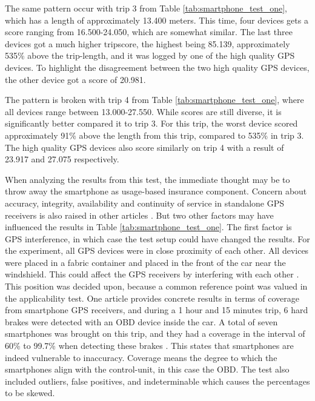 The same pattern occur with trip 3 from Table \ref{tab:smartphone_test_one}, which has a length of approximately 13.400 meters. This time, four devices gets a score ranging from 16.500-24.050, which are somewhat similar. The last three devices got a much higher tripscore, the highest being 85.139, approximately 535\% above the trip-length, and it was logged by one of the high quality GPS devices. To highlight the disagreement between the two high quality GPS devices, the other device got a score of 20.981. 

The pattern is broken with trip 4 from Table \ref{tab:smartphone_test_one}, where all devices range between 13.000-27.550. While scores are still diverse, it is significantly better compared it to trip 3. For this trip, the worst device scored approximately 91\% above the length from this trip, compared to 535\% in trip 3. The high quality GPS devices also score similarly on trip 4 with a result of 23.917 and 27.075 respectively. 

When analyzing the results from this test, the immediate thought may be to throw away the smartphone as usage-based insurance component. Concern about accuracy, integrity, availability and continuity of service in standalone GPS receivers is also raised in other articles  \citep{art:smartphones_for_monitoring_and_ubi} \citep{art:survey_mobile_phone_sensing} \citep{art:insurtelematics} \citep{art:in-car_positioning_technologies} \citep{art:challenges_smartphone_ubi}. But two other factors may have influenced the results in Table \ref{tab:smartphone_test_one}. The first factor is GPS interference, in which case the test setup could have changed the results. For the experiment, all GPS devices were in close proximity of each other. All devices were placed in a fabric container and placed in the front of the car near the windshield. This could affect the GPS receivers by interfering with each other \citep{art:gps_interference_two} \citep{art:gps_interference_one}. This position was decided upon, because a common reference point was valued in the applicability test. One article provides concrete results in terms of coverage from smartphone GPS receivers, and during a 1 hour and 15 minutes trip, 6 hard brakes were detected with an OBD device inside the car. A total of seven smartphones was brought on this trip, and they had a coverage in the interval of 60\% to 99.7\% when detecting these brakes \citep{art:insurtelematics}. This states that smartphones are indeed vulnerable to inaccuracy. Coverage means the degree to which the smartphones align with the control-unit, in this case the OBD. The test also included outliers, false positives, and indeterminable which causes the percentages to be skewed.

